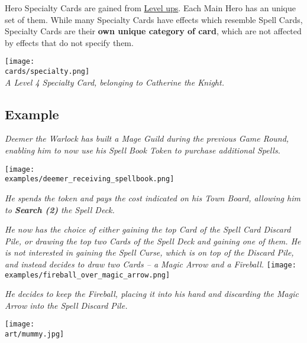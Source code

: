 \begin{multicols*}{2}
Hero Specialty Cards are gained from \hyperlink{Level}{Level ups}.
Each Main Hero has an unique set of them.
While many Specialty Cards have effects which resemble Spell Cards, Specialty Cards are their \textbf{own unique category of card}, which are not affected by effects that do not specify them.

\begin{center}
  \texttt{[image: \\cards/specialty.png]}\\
  \medskip
  \scriptsize\textit{A Level 4 Specialty Card, belonging to Catherine the Knight.}
\end{center}

\subsection*{Example}

\textit{Deemer the Warlock has built a Mage Guild during the previous Game Round, enabling him to now use his Spell Book Token to purchase additional Spells.}\par
\texttt{[image: \\examples/deemer\_receiving\_spellbook.png]}\par
\textit{He spends the token and pays the cost indicated on his Town Board, allowing him to \textbf{Search (2)} the Spell Deck.}\par
\textit{He now has the choice of either gaining the top Card of the Spell Card Discard Pile, or drawing the top two Cards of the Spell Deck and gaining one of them.
He is not interested in gaining the Spell Curse, which is on top of the Discard Pile, and instead decides to draw two Cards – a Magic Arrow and a Fireball.}
\texttt{[image: \\examples/fireball\_over\_magic\_arrow.png]}\par
\textit{He decides to keep the Fireball, placing it into his hand and discarding the Magic Arrow into the Spell Discard Pile.}

\texttt{[image: \\art/mummy.jpg]}
\end{multicols*}
